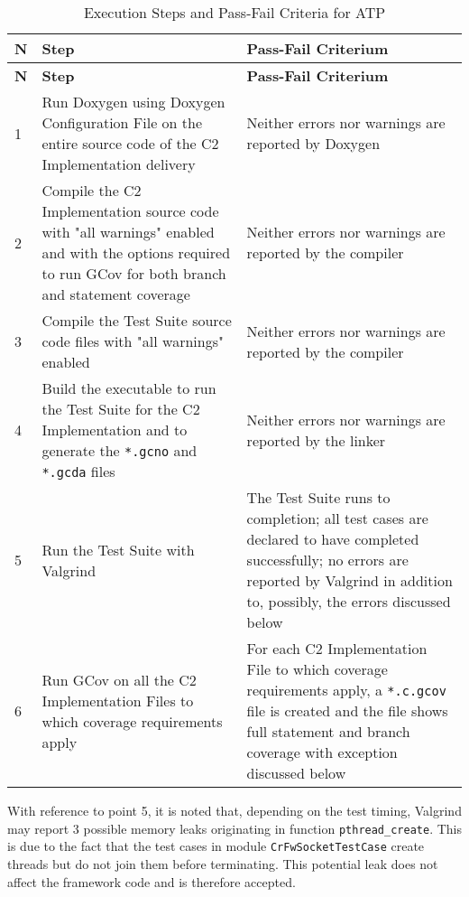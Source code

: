 \documentclass{pnp_article}
\begin{document}
\newpage
\begin{longtable}{|l|p{6.2cm}|p{6.2cm}|}
\caption{Execution Steps and Pass-Fail Criteria for ATP}\label{tab:atp} \\
\hline
\rowcolor{light-gray}
\textbf{N} & \textbf{Step} & \textbf{Pass-Fail Criterium} \\
\hline\hline
\endfirsthead
\rowcolor{light-gray}
\textbf{N} & \textbf{Step} & \textbf{Pass-Fail Criterium} \\
\hline\hline
\endhead

1 & Run Doxygen using Doxygen Configuration File on the entire source code of the C2 Implementation delivery &
Neither errors nor warnings are reported by Doxygen \\
\hline
2 & Compile the C2 Implementation source code with "all warnings" enabled and with the options required to run GCov for both branch and statement coverage &
Neither errors nor warnings are reported by the compiler \\
\hline
3 & Compile the Test Suite source code files with "all warnings" enabled &
Neither errors nor warnings are reported by the compiler \\
\hline
4 & Build the executable to run the Test Suite for the C2 Implementation and to generate the \texttt{*.gcno} and \texttt{*.gcda} files &
Neither errors nor warnings are reported by the linker \\
\hline
5 & Run the Test Suite with Valgrind &
The Test Suite runs to completion; all test cases are declared to have completed successfully; no errors are reported by Valgrind in addition to, possibly, the errors discussed below \\
\hline
6 & Run GCov on all the C2 Implementation Files to which coverage requirements apply &
For each C2 Implementation File to which coverage requirements apply, a \texttt{*.c.gcov}
file is created and the file shows full statement and branch coverage with exception discussed below \\
\hline
\end{longtable}


With reference to point 5, it is noted that, depending on the test timing, Valgrind may report 3 possible memory leaks originating in function \texttt{pthread\_create}. This is due to the fact that the test cases in module \texttt{CrFwSocketTestCase} create threads but do not join them before terminating. This potential leak does not affect the framework code and is therefore accepted.
\end{document}
